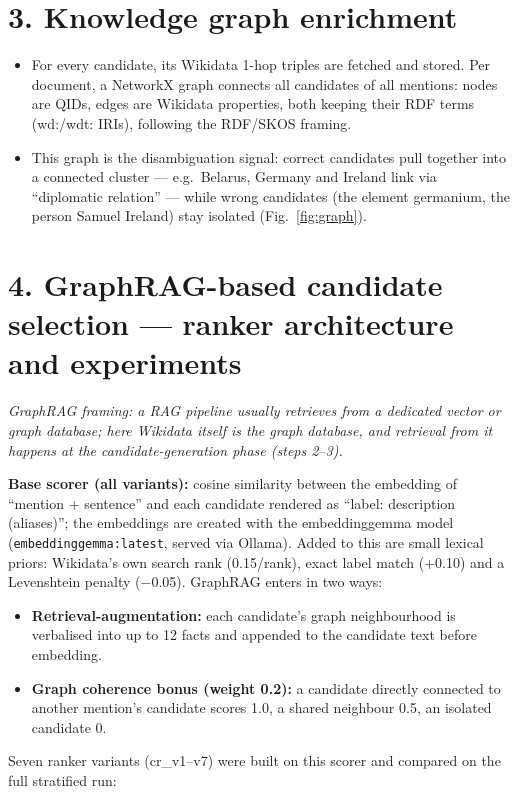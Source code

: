 \documentclass[10pt,a4paper]{article}
\begin{document}
\section*{3. Knowledge graph enrichment}
\begin{itemize}
  \item For every candidate, its Wikidata 1-hop triples are fetched and stored. Per document, a NetworkX graph connects all candidates of all mentions: nodes are QIDs, edges are Wikidata properties, both keeping their RDF terms (wd:/wdt: IRIs), following the RDF/SKOS framing.
  \item This graph is the disambiguation signal: correct candidates pull together into a connected cluster --- e.g.\ Belarus, Germany and Ireland link via ``diplomatic relation'' --- while wrong candidates (the element germanium, the person Samuel Ireland) stay isolated (Fig.~\ref{fig:graph}).
\end{itemize}

\section*{4. GraphRAG-based candidate selection --- ranker architecture and experiments}
\emph{GraphRAG framing: a RAG pipeline usually retrieves from a dedicated vector or graph database; here Wikidata itself is the graph database, and retrieval from it happens at the candidate-generation phase (steps 2--3).}

\textbf{Base scorer (all variants):} cosine similarity between the embedding of ``mention + sentence'' and each candidate rendered as ``label: description (aliases)''; the embeddings are created with the embeddinggemma model (\texttt{embeddinggemma:latest}, served via Ollama). Added to this are small lexical priors: Wikidata's own search rank (0.15/rank), exact label match (+0.10) and a Levenshtein penalty ($-$0.05). GraphRAG enters in two ways:
\begin{itemize}
  \item \textbf{Retrieval-augmentation:} each candidate's graph neighbourhood is verbalised into up to 12 facts and appended to the candidate text before embedding.
  \item \textbf{Graph coherence bonus (weight 0.2):} a candidate directly connected to another mention's candidate scores 1.0, a shared neighbour 0.5, an isolated candidate 0.
\end{itemize}

Seven ranker variants (cr\_v1--v7) were built on this scorer and compared on the full stratified run:
\end{document}
